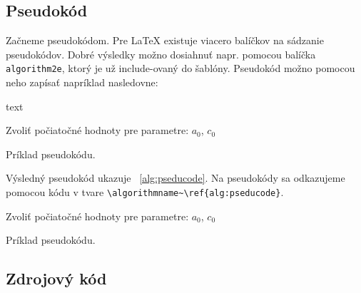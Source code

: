 \subsection{Pseudokód}

Začneme pseudokódom. Pre LaTeX existuje viacero balíčkov na sádzanie pseudokódov. Dobré výsledky možno dosiahnuť napr. pomocou balíčka \texttt{algorithm2e}, ktorý je už include-ovaný do šablóny. Pseudokód možno pomocou neho zapísať napríklad nasledovne:
\begin{inlinecode}{text}
\begin{algorithm}
Zvoliť počiatočné hodnoty pre parametre: $a_0$, $c_0$\;
\caption{Príklad pseudokódu.}
\label{alg:graddesc_iterative}
\end{algorithm}
\end{inlinecode}
Výsledný pseudokód ukazuje \algorithmname~\ref{alg:pseducode}. Na pseudokódy sa odkazujeme pomocou kódu v tvare \texttt{{\textbackslash}algorithmname\textasciitilde{\textbackslash}ref\{alg:pseducode\}}.

\begin{algorithm}
Zvoliť počiatočné hodnoty pre parametre: $a_0$, $c_0$\;
\caption{Príklad pseudokódu.}
\label{alg:pseducode}
\end{algorithm}

\subsection{Zdrojový kód}

